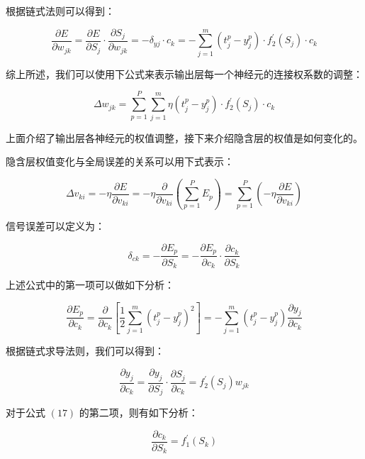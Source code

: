 \documentclass[UTF8]{ctexart}
\begin{document}
根据链式法则可以得到：

\begin{equation}
\frac{\partial E}{\partial w_{jk}} = \frac{\partial E}{\partial S_j} \cdot \frac{\partial S_j}{\partial w_{jk}} = - \delta_{yj} \cdot c_k = - \sum_{j=1}^{m} (t_{j}^{p} - y_{j}^{p}) \cdot f_2^{'}(S_j) \cdot c_k
\end{equation}

综上所述，我们可以使用下公式来表示输出层每一个神经元的连接权系数的调整：

\begin{equation}
\Delta w_{jk} = \sum_{p=1}^{P} \sum_{j=1}^{m} \eta (t_{j}^{p} - y_{j}^{p}) \cdot f_2^{'}(S_j) \cdot c_k
\end{equation}

上面介绍了输出层各神经元的权值调整，接下来介绍隐含层的权值是如何变化的。 \par

隐含层权值变化与全局误差的关系可以用下式表示：

\begin{equation}
\Delta v_{ki} = - \eta \frac{\partial E}{\partial v_{ki}} = - \eta \frac{\partial}{\partial v_{ki}} (\sum_{p=1}^{P} E_p) = \sum_{p=1}^{P} (- \eta \frac{\partial E}{\partial v_{ki}})
\end{equation}

信号误差可以定义为：

\begin{equation}
\delta_{ck} = -\frac{\partial E_p}{\partial S_k} = -\frac{\partial E_p}{\partial c_k} \cdot \frac{\partial c_k}{\partial S_k}
\end{equation}

上述公式中的第一项可以做如下分析：

\begin{equation}
\frac{\partial E_p}{\partial c_k} = \frac{\partial}{\partial c_k} [\frac{1}{2} \sum_{j=1}^{m}  (t_{j}^{p} - y_{j}^{p})^2] = - \sum_{j=1}^{m} (t_{j}^{p} - y_{j}^{p}) \frac{\partial y_j}{\partial c_k}
\end{equation}

根据链式求导法则，我们可以得到：

\begin{equation}
\frac{\partial y_j}{\partial c_k} = \frac{\partial y_j}{\partial S_j} \cdot \frac{\partial S_j}{\partial c_k} = f_{2}^{'}(S_j)w_{jk}
\end{equation}

对于公式 $(17)$ 的第二项，则有如下分析：

\begin{equation}
\frac{\partial c_k}{\partial S_k} = f_{1}^{'}(S_k)
\end{equation}
\end{document}
